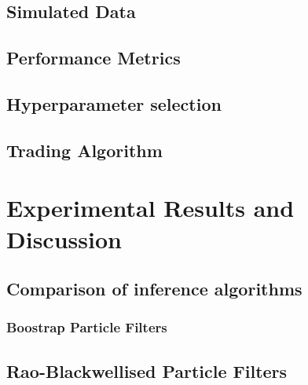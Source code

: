 \documentclass[12pt]{article}
\begin{document}
	\subsection{Simulated Data} \label{sec:experimental_simulated}
	
	\subsection{Performance Metrics}\label{sec:experimental_performance}
	
	
	\subsection{Hyperparameter selection} \label{sec:experimental_hyperparameter}

	
	\subsection{Trading Algorithm}
	
	
	
	
	

\section{Experimental Results and Discussion}

    \subsection{Comparison of inference algorithms} \label{sec:results_comparison}
    
    
    	\subsubsection{Boostrap Particle Filters} \label{sec:results_drift_corrected}
    	
    	\subsection{Rao-Blackwellised Particle Filters} \label{sec:results_rbpf}
    
\end{document}
